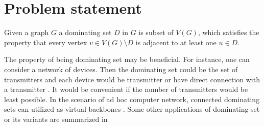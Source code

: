 \section{Problem statement}
\begin{definition}
Given a graph $G$ a dominating set $D$ in $G$ is subset of $V(G)$, which satisfies the property that every vertex $v \in V(G)\setminus D$ is adjacent to at least one $u \in D$.
\end{definition}
The property of being dominating set may be beneficial. For instance, one can consider a network of devices. Then the dominating set could be the set of transmitters and each device would be transmitter or have direct connection with a transmitter \cite{dijkstra2022weighted}. It would be convenient if the number of transmitters would be least possible. In the scenario of ad hoc computer network, connected dominating sets can utilized as virtual backbones \cite{BAI2020102023}. Some other applications of dominating set or its variants are summarized in \cite{levin2020combinatorial}

